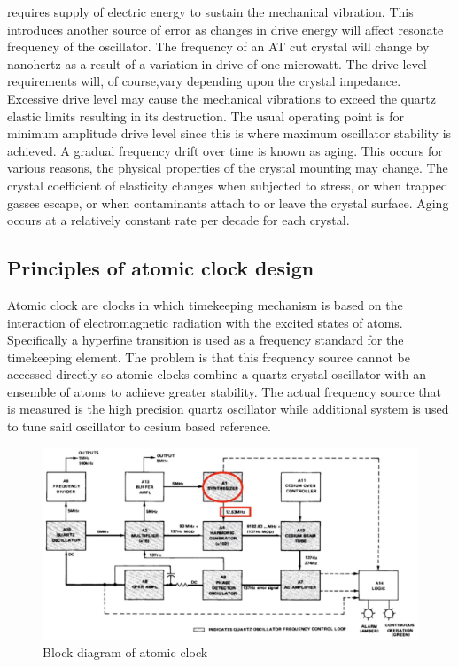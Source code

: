 requires supply of electric energy to sustain the mechanical vibration.
This introduces another source of error as changes in drive energy will affect resonate frequency 
of the oscillator. The frequency of an AT cut crystal will change by nanohertz as a result
of a variation in drive of one microwatt.
The drive level requirements will, of course,vary depending upon the crystal impedance. 
Excessive drive level may cause the mechanical vibrations to exceed the quartz elastic limits 
resulting in its destruction. The usual operating point is for minimum amplitude drive level
since this is where maximum oscillator stability is achieved.
A gradual frequency drift over time is known as aging.
This occurs for various reasons, the physical properties of the crystal mounting may change.
The crystal coefficient of elasticity changes when subjected to stress, or when trapped gasses 
escape, or when contaminants attach to or leave the crystal surface. 
Aging occurs at a relatively constant rate per decade for each crystal.

\subsection{Principles of atomic clock design}
Atomic clock are clocks in which timekeeping mechanism is based on the interaction of 
electromagnetic radiation with the excited states of atoms.
Specifically a hyperfine transition is used as a frequency standard for the timekeeping element.
The problem is that this frequency source cannot be accessed directly so atomic clocks combine 
a quartz crystal oscillator with an ensemble of atoms to achieve greater stability.
The actual frequency source that is measured is the high precision quartz oscillator while 
additional system is used to tune said oscillator to cesium based reference.
\begin{figure} 
	\label{fig:atomic_diagram}
	\centering
	\includegraphics[width=\textwidth]{figures/atomic_diagram}
	\caption{Block diagram of atomic clock}
\end{figure}

